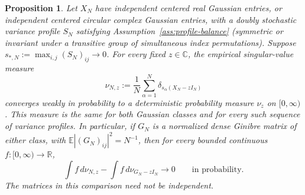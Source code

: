 \documentclass[11pt,reqno]{amsart}
\numberwithin{equation}{section}
\theoremstyle{plain}
\newtheorem{proposition}[theorem]{Proposition}
\theoremstyle{definition}
\theoremstyle{remark}
\begin{document}
\begin{proposition}\label{prop:global}
Let $X_N$ have independent centered real Gaussian entries, or independent
centered circular complex Gaussian entries, with a doubly stochastic
variance profile $S_N$ satisfying Assumption~\ref{ass:profile-balance}
(symmetric or invariant under a transitive group of simultaneous index
permutations).  Suppose
$s_{*,N}:=\max_{i,j}(S_N)_{ij}\to0$.  For every fixed $z\in\mathbb C$, the
empirical singular-value measure
\[
 \nu_{N,z}:=\frac1N\sum_{\alpha=1}^N
 \delta_{s_\alpha(X_N-zI_N)}
\]
converges weakly in probability to a deterministic probability measure
$\nu_z$ on $[0,\infty)$.  This measure is the same for both Gaussian
classes and for every such sequence of variance profiles.  In particular,
if $G_N$ is a normalized dense Ginibre matrix of either class, with
$\mathbb E|(G_N)_{ij}|^2=N^{-1}$, then for every bounded continuous
$f:[0,\infty)\to\mathbb R$,
\begin{equation}\label{eq:global-comparison}
 \int f\,d\nu_{N,z}-\int f\,d\nu_{G_N-zI_N}
 \longrightarrow0\qquad\text{in probability}.
\end{equation}
The matrices in this comparison need not be independent.
\end{proposition}
\end{document}
